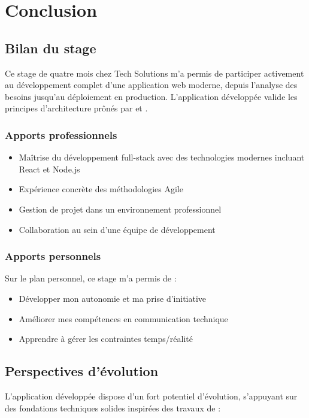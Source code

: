 \chapter{Conclusion}

\section{Bilan du stage}
Ce stage de quatre mois chez Tech Solutions m'a permis de participer activement au développement complet d'une application web moderne, depuis l'analyse des besoins jusqu'au déploiement en production. L'application développée valide les principes d'architecture prônés par \cite{martin2017clean} et \cite{fielding2000rest}.

\subsection{Apports professionnels}
\begin{itemize}
	\item Maîtrise du développement full-stack avec des technologies modernes incluant React \cite{react2024} et Node.js \cite{nodejs2024}
	\item Expérience concrète des méthodologies Agile
	\item Gestion de projet dans un environnement professionnel
	\item Collaboration au sein d'une équipe de développement
\end{itemize}

\subsection{Apports personnels}
Sur le plan personnel, ce stage m'a permis de :
\begin{itemize}
	\item Développer mon autonomie et ma prise d'initiative
	\item Améliorer mes compétences en communication technique
	\item Apprendre à gérer les contraintes temps/réalité
\end{itemize}

\section{Perspectives d'évolution}
L'application développée dispose d'un fort potentiel d'évolution, s'appuyant sur des fondations techniques solides inspirées des travaux de \cite{martin2017clean} :

